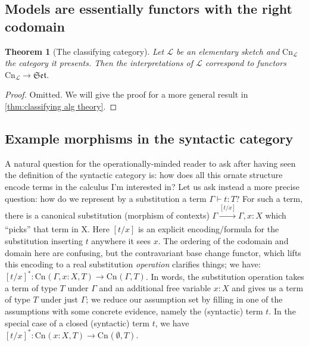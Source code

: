 \documentclass[12pt,twoside]{reedthesis}
\theoremstyle{definition}
\theoremstyle{remark}
\theoremstyle{plain}
\newtheorem{theorem}{Theorem}
\begin{document}
\subsection{Models are essentially functors with the right codomain}
\newcommand{\clone}[3]{{\text{Cn}_{#1}(#2,#3)}}
\newcommand{\cn}{\mathrm{Cn}}
\begin{theorem}[The classifying category]\label{thm:classify_elem_sketch}
  Let $\mathcal{L}$ be an elementary sketch and \( \cn_{\mathcal{L}} \) the
  category it presents. Then the interpretations of $\mathcal{L}$ correspond to
  functors $\cn_{\mathcal{L}} \rightarrow \mathfrak{Set}$.
\end{theorem}
\begin{proof}
  Omitted. We will give the proof for a more general result in
  \ref{thm:classifying alg theory}.
\end{proof}


\subsection{Example morphisms in the syntactic category}
A natural question for the operationally-minded reader to ask after having seen
the definition of the syntactic category is: how does all this ornate structure
encode terms in the calculus I'm interested in? Let us ask instead a more
precise question: how do we represent by a substitution a term \(\Gamma \vdash t : T\)?
For such a term, there is a canonical substitution (morphism of contexts)
\( \Gamma \xrightarrow[]{[t/x]} \Gamma,x:X \) which ``picks'' that term in X. Here $[t/x]$
is an explicit encoding/formula for the substitution inserting $t$ anywhere it
sees $x$. The ordering of the codomain and domain here are confusing, but the
contravariant base change functor, which lifts this encoding to a real
substitution \emph{operation} clarifies things; we have:
\( [t/x]^{*} : \clone{}{\Gamma, x:X}{T} \longrightarrow \clone{}{\Gamma}{T} \). In words, the
substitution operation takes a term of type $T$ under $\Gamma$ and an additional free
variable $x:X$ and gives us a term of type $T$ under just $\Gamma$; we reduce our
assumption set by filling in one of the assumptions with some concrete evidence,
namely the (syntactic) term $t$. In the special case of a closed (syntactic)
term $t$, we have \( [t/x]^{*} : \clone{}{x:X}{T} \longrightarrow \clone{}{\emptyset}{T}\).
\end{document}
